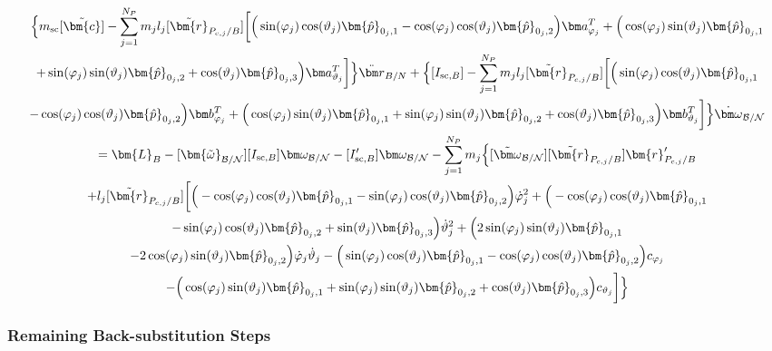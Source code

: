 \begin{multline}
	\Big\{m_{\text{sc}}[\tilde{\bm{c}}] - \sum\limits_{j=1}^{N_P}m_j l_j [\tilde{\bm{r}}_{P_{c,j}/B}] \bigg[
	\Big(\sin(\varphi_j)\cos(\vartheta_j)\bm{\hat{p}}_{0_j,1}-\cos(\varphi_j)\cos(\vartheta_j)\bm{\hat{p}}_{0_j,2}\Big)\bm a_{\varphi_j}^T
	+\Big(\cos(\varphi_j)\sin(\vartheta_j)\bm{\hat{p}}_{0_j,1}\\+\sin(\varphi_j)\sin(\vartheta_j)\bm{\hat{p}}_{0_j,2}+\cos(\vartheta_j)\bm{\hat{p}}_{0_j,3} \Big)\bm a_{\vartheta_j}^T
	\bigg]
	\Big\}\ddot{\bm r}_{B/N}
	+\Big\{[I_{\text{sc},B}] - \sum\limits_{j=1}^{N_P}m_j l_j [\tilde{\bm{r}}_{P_{c,j}/B}] \bigg[
	\Big(\sin(\varphi_j)\cos(\vartheta_j)\bm{\hat{p}}_{0_j,1}\\-\cos(\varphi_j)\cos(\vartheta_j)\bm{\hat{p}}_{0_j,2}\Big)\bm b_{\varphi_j}^T
	+\Big(\cos(\varphi_j)\sin(\vartheta_j)\bm{\hat{p}}_{0_j,1}
	+\sin(\varphi_j)\sin(\vartheta_j)\bm{\hat{p}}_{0_j,2}+\cos(\vartheta_j)\bm{\hat{p}}_{0_j,3} \Big)\bm b_{\vartheta_j}^T
	\bigg]
	\Big\}\dot{\bm\omega}_{\cal B/N}
	\\=
	\bm{L}_B-[\bm{\tilde{\omega}}_{\cal B/N}] [I_{\text{sc},B}] \bm\omega_{\cal B/N}
	- [I'_{\text{sc},B}] \bm\omega_{\cal B/N}- \sum\limits_{j=1}^{N_P} m_j \Big\{[\tilde{\bm\omega}_{\cal B/N}] [\tilde{\bm{r}}_{P_{c,j}/B}] \bm{r}'_{P_{c,j}/B}
	\\+l_j[\tilde{\bm{r}}_{P_{c,j}/B}]\bigg[
	\Big(-\cos(\varphi_j)\cos(\vartheta_j)\bm{\hat{p}}_{0_j,1}-\sin(\varphi_j)\cos(\vartheta_j)\bm{\hat{p}}_{0_j,2}\Big)\dot{\varphi}_j^2
	+\Big(-\cos(\varphi_j)\cos(\vartheta_j)\bm{\hat{p}}_{0_j,1}\\-\sin(\varphi_j)\cos(\vartheta_j)\bm{\hat{p}}_{0_j,2}+\sin(\vartheta_j)\bm{\hat{p}}_{0_j,3} \Big)\dot{\vartheta}_j^2 +
	\Big(2\sin(\varphi_j)\sin(\vartheta_j)\bm{\hat{p}}_{0_j,1} \\-2\cos(\varphi_j)\sin(\vartheta_j)\bm{\hat{p}}_{0_j,2}\Big)\dot{\varphi}_j\dot{\vartheta}_j
	- \Big(\sin(\varphi_j)\cos(\vartheta_j)\bm{\hat{p}}_{0_j,1} -\cos(\varphi_j)\cos(\vartheta_j)\bm{\hat{p}}_{0_j,2}\Big)c_{\varphi_j} \\-   \Big(\cos(\varphi_j)\sin(\vartheta_j)\bm{\hat{p}}_{0_j,1}+\sin(\varphi_j)\sin(\vartheta_j)\bm{\hat{p}}_{0_j,2}+\cos(\vartheta_j)\bm{\hat{p}}_{0_j,3}\Big) c_{\vartheta_j}
	\bigg]\Big\}
	\label{eq:Final7}
\end{multline}

\subsubsection{Remaining Back-substitution Steps}

